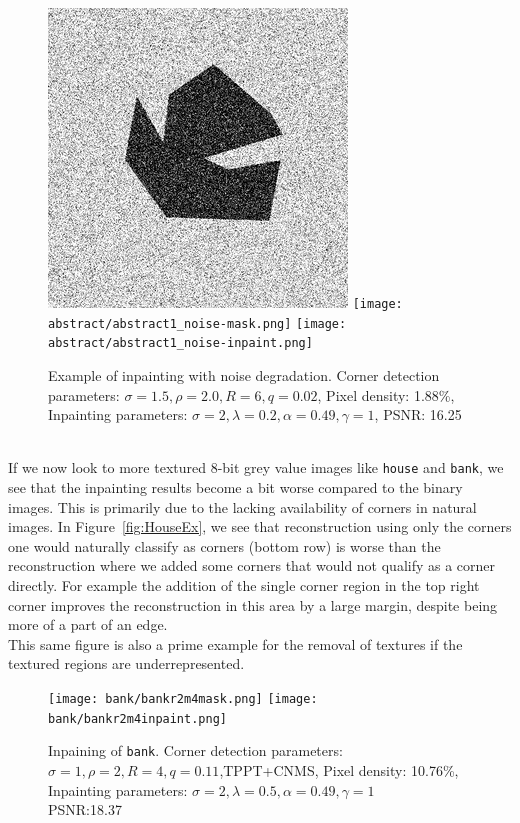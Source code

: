 \begin{figure}[ht]
    \centering
    \includegraphics[width=0.29\linewidth]{../../images/binary/abstract1_noise.png}
    \texttt{[image: abstract/abstract1\_noise-mask.png]}
    \texttt{[image: abstract/abstract1\_noise-inpaint.png]}
    \caption{Example of inpainting with noise degradation. Corner detection parameters:
    $\sigma=1.5,\rho=2.0,R=6,q=0.02$, Pixel density: 1.88\%, Inpainting parameters:
$\sigma=2,\lambda=0.2,\alpha=0.49,\gamma=1$, PSNR\@: 16.25}\label{fig:AbstractNoise2}
\end{figure}                                       
\\ \noindent If we now look to more textured 8-bit grey value images like \texttt{house} and \texttt{bank}, we
see that the inpainting results become a bit worse compared to the binary images. This is primarily
due to the lacking availability of corners in natural images.\newpage\noindent
In Figure~\ref{fig:HouseEx}, we see that reconstruction using only the corners one would naturally
classify as corners (bottom row) is worse than the reconstruction where we added some corners that
would not qualify as a corner directly. For example the addition of the single corner region in the
top right corner improves the reconstruction in this area by a large margin, despite being more of
a part of an edge.\\
This same figure is also a prime example for the removal of textures if the textured regions are
underrepresented.

\begin{figure}[htpb]
    \centering
    \texttt{[image: bank/bankr2m4mask.png]}
    \texttt{[image: bank/bankr2m4inpaint.png]}\\\vspace{0.2cm}
    \caption{Inpaining of \texttt{bank}. Corner detection parameters:
        $\sigma=1,\rho=2,R=4,q=0.11$,TPPT+CNMS,
    Pixel density: 10.76\%, Inpainting parameters: $\sigma=2,\lambda=0.5,\alpha=0.49,\gamma=1$\\
PSNR:\@18.37}\label{fig:BankEx}
\end{figure}


